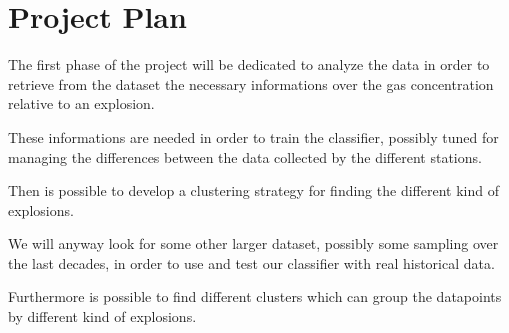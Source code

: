 \documentclass[12pt,a4paper]{article}
\begin{document}
\section{Project Plan}
The first phase of the project will be dedicated to analyze the data in 
order to retrieve from the dataset the necessary informations over the
gas concentration relative to an explosion.

These informations are needed in order to train the classifier, possibly
tuned for managing the differences between the data collected by the 
different stations.

Then is possible to develop a clustering strategy for finding the different
kind of explosions. 

We will anyway look for some other larger dataset, possibly some sampling 
over the last decades, in order to use and test our classifier with real 
historical data. 

Furthermore is possible to find different clusters which can group the 
datapoints by different kind of explosions.
\end{document}
